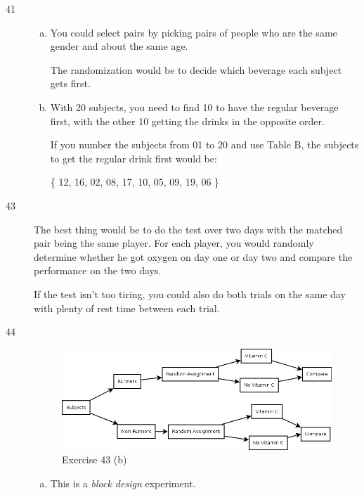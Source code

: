 \documentclass[letterpaper, landscape]{exam}
\begin{document}
\begin{description}
      \item[41] 
        \begin{enumerate}[(a)]
          \item You could select pairs by picking pairs of people who are the
            same gender and about the same age.  
            
            The randomization would be to decide which beverage each subject
            gets first.

          \item With 20 subjects, you need to find 10 to have the regular
            beverage first, with the other 10 getting the drinks in the opposite
            order.

            If you number the subjects from 01 to 20 and use Table B, the
            subjects to get the regular drink first would be:

            \{ 12, 16, 02, 08, 17, 10, 05, 09, 19, 06 \}

        \end{enumerate}

      \item[43]
        The best thing would be to do the test over two days with the matched
        pair being the same player.  For each player, you would randomly
        determine whether he got oxygen on day one or day two and compare the
        performance on the two days.

        If the test isn't too tiring, you could also do both trials on the same
        day with plenty of rest time between each trial.


      \item[44]
        \begin{figure}[H]
          \centering
          \includegraphics[scale = 0.3]{ex43.png}
          \caption{Exercise 43 (b)}\label{fig:ex43}
        \end{figure}
        \begin{enumerate}[(a)]
          \item This is a {\em block design\/} experiment.


\end{enumerate}
\end{description}
\end{document}
